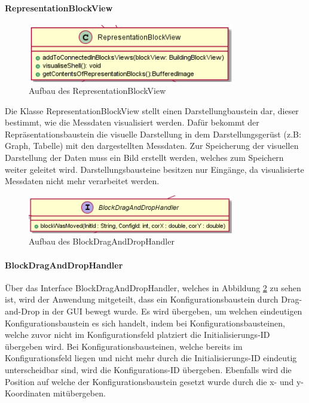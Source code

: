 \documentclass[parskip=full]{scrartcl}
\begin{document}
\paragraph{RepresentationBlockView} 

\begin{figure}[htbp]
	\begin{center}
		\includegraphics[width = 9cm]{Grafiken/View/RepresentationBlockView.PNG}
		\caption{Aufbau des RepresentationBlockView}
		\label{Entwurf_Grob}
	\end{center}
\end{figure}

Die Klasse RepresentationBlockView stellt einen Darstellungbaustein dar, dieser bestimmt, wie die Messdaten visualisiert werden. Dafür bekommt der Repräsentationsbaustein die visuelle Darstellung in dem Darstellungsgerüst (z.B: Graph, Tabelle) mit den dargestellten Messdaten.
Zur Speicherung der visuellen Darstellung der Daten muss ein Bild erstellt werden, welches zum Speichern weiter geleitet wird.
Darstellungsbausteine besitzen nur Eingänge, da visualisierte Messdaten nicht mehr verarbeitet werden. 

\clearpage

\begin{figure}[htbp]
	\begin{center}
		\includegraphics[width = 9cm]{Grafiken/View/BlockDragAndDropHandler.PNG}
		\caption{Aufbau des BlockDragAndDropHandler}
		\label{BlockDragAndDropHandler}
	\end{center}
\end{figure}

\paragraph{BlockDragAndDropHandler}

Über das Interface BlockDragAndDropHandler, welches in Abbildung \ref{BlockDragAndDropHandler} zu sehen ist, wird der Anwendung mitgeteilt, dass ein Konfigurationsbaustein durch Drag-and-Drop in der GUI bewegt wurde. Es wird übergeben, um welchen eindeutigen Konfigurationsbaustein es sich handelt, indem bei Konfigurationsbausteinen, welche zuvor nicht im Konfigurationsfeld platziert die Initialisierungs-ID übergeben wird. Bei Konfigurationsbausteinen, welche bereits im Konfigurationsfeld liegen und nicht mehr durch die Initialisierungs-ID eindeutig unterscheidbar sind, wird die Konfigurations-ID übergeben. Ebenfalls wird die Position auf welche der Konfigurationsbaustein gesetzt wurde durch die x- und y- Koordinaten mitübergeben.
\end{document}
